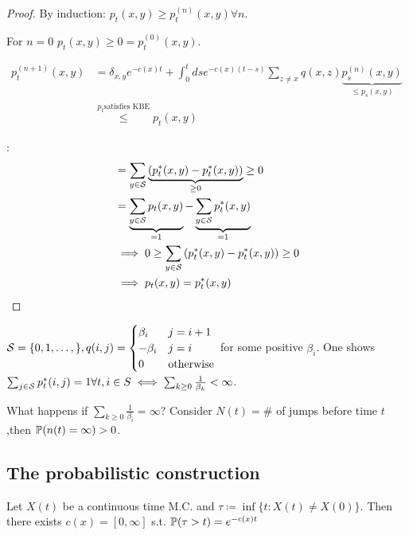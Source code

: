 \begin{proof}
     By induction: \(p_t(x,y)\geq p_t^{(n)}(x,y)\forall n\).
    
    For \(n=0\) \(p_t(x,y)\geq 0 =p_t^{(0)}(x,y)\).

    \begin{align*}
        p_t^{(n+1)}(x,y)&=\delta_{x,y}e^{-c(x)t}+\int_0^tds e^{-c(x)(t-s)}\sum_{z\neq x}q(x,z)\underbrace{p_s^{(n)}(x,y)}_{\leq p_s(x,y)}\\
        &\stackrel{p_t \text{satisfies KBE}}{\leq} p_t(x,y)
    \end{align*}

    : \begin{align*}
        &=\sum_{y\in \mathcal{S}}\underbrace{\left(p_t^*(x,y)-p_t^*(x,y)\right)}_{\geq 0}\geq 0\\
        &=\underbrace{\sum_{y\in\mathcal{S}}p_t(x,y)}_{=1}-\underbrace{\sum_{y\in\mathcal{S}} p_t^*(x,y)}_{=1}\\
        &\implies 0 \geq \sum_{y\in \mathcal{S}}\left(p_t^*(x,y)-p_t^*(x,y)\right)\geq 0\\
        &\implies p_t(x,y)=p_t^*(x,y)\qedhere
    \end{align*}
\end{proof}

\begin{example}
    \(\mathcal{S}=\{0,1,\dots,\},q(i,j)=\begin{cases}
        \beta_i & j=i+1\\
        -\beta_i & j=i\\
        0 & \text{otherwise}
    \end{cases}\) for some positive \(\beta_i\).
    One shows \(\sum_{j\in\mathcal{S}} p_t^*(i,j)=1\forall t,i\in S\iff \sum_{k\geq 0}\frac{1}{\beta_k}<\infty\).

    What happens if \(\sum_{k\geq 0}\frac{1}{\beta_i}=\infty\)? Consider \(N(t)=\#\) of jumps before time \(t\),then 
    \(\mathbb{P}(n(t)=\infty)>0\).
\end{example}

\subsection{The probabilistic construction}

\begin{lemma}\label{lem:1.21}
    Let \(X(t)\) be a continuous time M.C. and \(\tau\coloneqq \inf\{t:X(t)\neq X(0)\}\). Then there exists \(c(x)=[0,\infty]\) s.t. 
    \(\mathbb{P}(\tau>t)=e^{-{c(x)t}}\)
\end{lemma}

